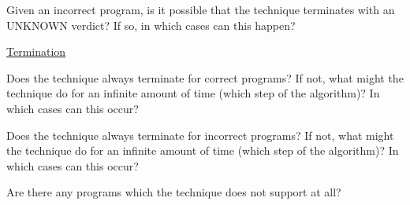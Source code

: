 \documentclass[a4paper]{article}
\begin{document}
\begin{minipage}[t]{0.16\linewidth}
\begin{betterlist}
\begin{betterlist}
\begin{betterlist}
				\item Given an incorrect program, is it possible that the technique terminates with an UNKNOWN verdict? If so, in which cases can this happen?

			\end{betterlist}
			\item \underline{Termination}
			\begin{betterlist}
				\item Does the technique always terminate for correct programs? If not, what might the technique do for an infinite amount of time (which step of the algorithm)? In which cases can this occur?

				\item Does the technique always terminate for incorrect programs? If not, what might the technique do for an infinite amount of time (which step of the algorithm)? In which cases can this occur?

			\end{betterlist}
			\item Are there any programs which the technique does not support at all?


\end{betterlist}
\end{betterlist}
\end{minipage}
\end{document}

